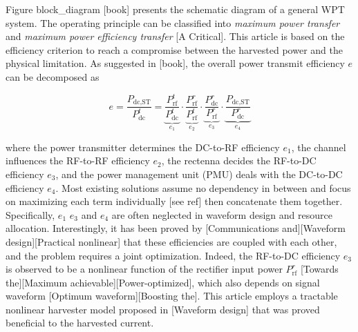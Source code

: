 Figure {block_diagram} [book] presents the schematic diagram of a general WPT system. The operating principle can be classified into \textit{maximum power transfer} and \textit{maximum power efficiency transfer} [A Critical]. This article is based on the efficiency criterion to reach a compromise between the harvested power and the physical limitation. As suggested in [book], the overall power transmit efficiency $e$ can be decomposed as

\begin{equation}\label{eqn:power_utilization_efficiency}
  e = \frac{{{P_{{\text{dc}},{\text{ST}}}}}}{{P_{{\text{dc}}}^t}} = \underbrace {\frac{{P_{{\text{rf}}}^t}}{{P_{{\text{dc}}}^t}}}_{{e_1}} \cdot \underbrace {\frac{{P_{{\text{rf}}}^r}}{{P_{{\text{rf}}}^t}}}_{{e_2}} \cdot \underbrace {\frac{{P_{{\text{dc}}}^r}}{{P_{{\text{rf}}}^r}}}_{{e_3}} \cdot \underbrace {\frac{{{P_{{\text{dc}},{\text{ST}}}}}}{{P_{{\text{dc}}}^r}}}_{{e_4}}
\end{equation}

where the power transmitter determines the DC-to-RF efficiency ${e_1}$, the channel influences the RF-to-RF efficiency ${e_2}$, the rectenna decides the RF-to-DC efficiency ${e_3}$, and the power management unit (PMU) deals with the DC-to-DC efficiency ${e_4}$. Most existing solutions assume no dependency in between and focus on maximizing each term individually [see ref] then concatenate them together. Specifically, ${e_1}$ ${e_3}$ and ${e_4}$ are often neglected in waveform design and resource allocation. Interestingly, it has been proved by [Communications and][Waveform design][Practical nonlinear] that these efficiencies are coupled with each other, and the problem requires a joint optimization. Indeed, the RF-to-DC efficiency ${e_3}$ is observed to be a nonlinear function of the rectifier input power ${P_{{\text{rf}}}^r}$ [Towards the][Maximum achievable][Power-optimized], which also depends on signal waveform [Optimum waveform][Boosting the]. This article employs a tractable nonlinear harvester model proposed in [Waveform design] that was proved beneficial to the harvested current. 